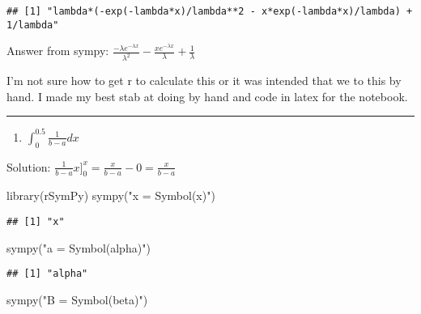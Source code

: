 \documentclass[
]{article}
\newenvironment{Shaded}{\begin{snugshade}}{\end{snugshade}}
\newcommand{\FunctionTok}[1]{\textcolor[rgb]{0.00,0.00,0.00}{#1}}
\newcommand{\NormalTok}[1]{#1}
\newcommand{\StringTok}[1]{\textcolor[rgb]{0.31,0.60,0.02}{#1}}
\providecommand{\tightlist}{%
  \setlength{\itemsep}{0pt}\setlength{\parskip}{0pt}}
\begin{document}
\begin{verbatim}
## [1] "lambda*(-exp(-lambda*x)/lambda**2 - x*exp(-lambda*x)/lambda) + 1/lambda"
\end{verbatim}

Answer from sympy:
\(\frac{-\lambda e^{-\lambda x}}{\lambda^2}-\frac{x e^{-\lambda x}}{\lambda}+\frac{1}{\lambda}\)

I'm not sure how to get r to calculate this or it was intended that we
to this by hand. I made my best stab at doing by hand and code in latex
for the notebook.

\begin{center}\rule{0.5\linewidth}{0.5pt}\end{center}

\begin{enumerate}
\def\labelenumi{\arabic{enumi}.}
\setcounter{enumi}{6}
\tightlist
\item
  \(\int_0^{0.5} \frac{1}{b−a}dx\)
\end{enumerate}

Solution: \(\frac{1}{b-a} x ]_0^x = \frac{x}{b-a} - 0 = \frac{x}{b-a}\)

\begin{Shaded}
\begin{Highlighting}[]
\FunctionTok{library}\NormalTok{(rSymPy)}
\FunctionTok{sympy}\NormalTok{(}\StringTok{"x = Symbol(\textquotesingle{}x\textquotesingle{})"}\NormalTok{)}
\end{Highlighting}
\end{Shaded}

\begin{verbatim}
## [1] "x"
\end{verbatim}

\begin{Shaded}
\begin{Highlighting}[]
\FunctionTok{sympy}\NormalTok{(}\StringTok{"a = Symbol(\textquotesingle{}alpha\textquotesingle{})"}\NormalTok{)}
\end{Highlighting}
\end{Shaded}

\begin{verbatim}
## [1] "alpha"
\end{verbatim}

\begin{Shaded}
\begin{Highlighting}[]
\FunctionTok{sympy}\NormalTok{(}\StringTok{"B = Symbol(\textquotesingle{}beta\textquotesingle{})"}\NormalTok{)}
\end{Highlighting}
\end{Shaded}
\end{document}
